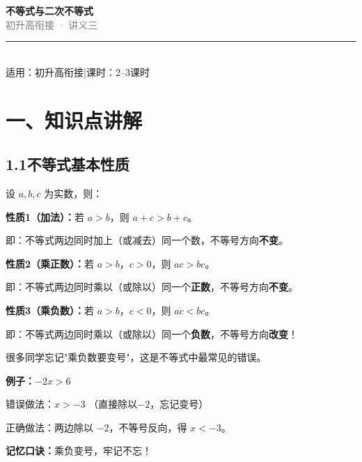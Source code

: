\documentclass[12pt, a4paper]{ctexart}
\begin{document}
\begin{center}
{\Huge\bfseries\textcolor{mainblue}{不等式与二次不等式}}\\[12pt]
{\Large\textcolor{gray}{初升高衔接 · 讲义三}}\\[8pt]
\rule{0.6\textwidth}{1pt}\\[8pt]
{\normalsize 适用：初升高衔接\quad |\quad 课时：2--3课时}
\end{center}
\vspace{10pt}

\section*{\textcolor{mainblue}{一、知识点讲解}}

\subsection*{1.1\quad 不等式基本性质}

\begin{knowledgebox}[不等式的三条基本性质]
设 $a, b, c$ 为实数，则：

\textbf{性质1（加法）：}若 $a > b$，则 $a + c > b + c$。

\quad 即：不等式两边同时加上（或减去）同一个数，不等号方向\textbf{不变}。

\textbf{性质2（乘正数）：}若 $a > b$，$c > 0$，则 $ac > bc$。

\quad 即：不等式两边同时乘以（或除以）同一个\textbf{正数}，不等号方向\textbf{不变}。

\textbf{性质3（乘负数）：}若 $a > b$，$c < 0$，则 $ac < bc$。

\quad 即：不等式两边同时乘以（或除以）同一个\textbf{负数}，不等号方向\textbf{改变}！
\end{knowledgebox}

\begin{warnbox}
很多同学忘记"乘负数要变号"，这是不等式中最常见的错误。

\textbf{例子：}$-2x > 6$

错误做法：$x > -3$ \quad （直接除以$-2$，忘记变号）

正确做法：两边除以 $-2$，不等号反向，得 $x < -3$。

\medskip
\textbf{记忆口诀：}乘负变号，牢记不忘！
\end{warnbox}
\end{document}
